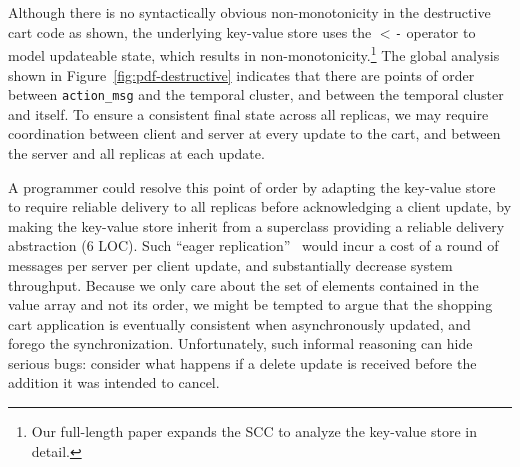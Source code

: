 Although there is no syntactically obvious non-monotonicity in the destructive
cart code as shown, the underlying key-value store uses the \texttt{$<$-} operator to model updateable state, which results in non-monotonicity.\footnote{Our full-length paper expands the SCC to analyze the
key-value store in detail.}
The global analysis shown in Figure~\ref{fig:pdf-destructive}
indicates that there are
points of order between \texttt{action\_msg} and the temporal cluster,
and between the temporal cluster and itself.
To ensure a consistent final state across all replicas, we may require coordination
between client and server at every update to the cart, and between the 
server and all replicas at each update.   

A programmer could resolve this point of order by adapting the key-value store
to require reliable delivery to all replicas before acknowledging a client update, by
making the key-value store inherit from a superclass providing a reliable delivery
abstraction (6 LOC).
Such ``eager replication''~\cite{dangers} would incur a cost of a round of messages
per server per client update, and substantially decrease system throughput.  
Because we only care about the set of elements contained in the value array
and not its order, we might be tempted to argue that 
the shopping cart application is eventually consistent
when asynchronously updated, and forego the synchronization.  Unfortunately, such informal reasoning can hide serious bugs: consider what happens if a delete update is received
before the addition it was intended to cancel.



